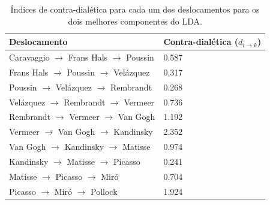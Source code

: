 \begin{table}[ht]
  \begin{center}
  \caption{\label{tab:dialetica3} Índices de contra-dialética para cada um dos
    deslocamentos para os dois melhores componentes do LDA.}
\begin{tabular}{@{}ll}
    \hline \hline
    \textbf{Deslocamento} & \textbf{Contra-dialética ($d_{i \rightarrow k}$)} \\
    \hline
    Caravaggio $\to$ Frans Hals $\to$ Poussin   & 0.587 \\
    Frans Hals $\to$ Poussin $\to$ Velázquez & 0.317 \\
    Poussin $\to$ Velázquez $\to$ Rembrandt  & 0.268 \\
    Velázquez $\to$ Rembrandt $\to$ Vermeer  & 0.736 \\
    Rembrandt $\to$ Vermeer $\to$ Van Gogh      & 1.192 \\
    Vermeer $\to$ Van Gogh $\to$ Kandinsky      & 2.352 \\
    Van Gogh $\to$ Kandinsky $\to$ Matisse      & 0.974 \\
    Kandinsky $\to$ Matisse $\to$ Picasso       & 0.241 \\
    Matisse $\to$ Picasso $\to$ Miró         & 0.704 \\
    Picasso $\to$ Miró $\to$ Pollock         & 1.924 \\
    \hline \hline
  \end{tabular}
  \fonteminha
  \end{center}
\end{table}


